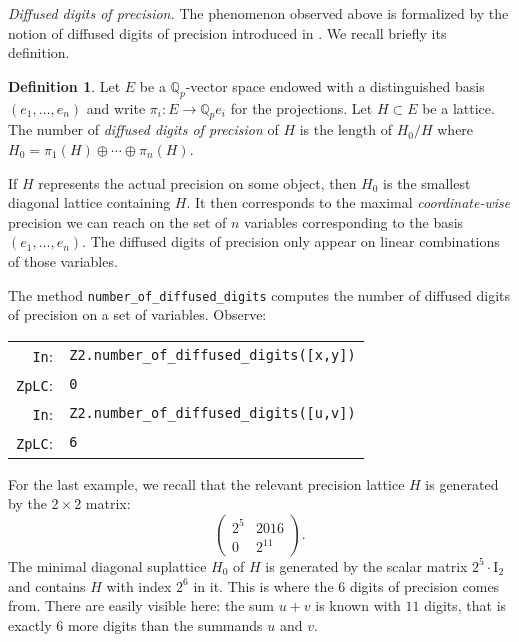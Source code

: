 \documentclass[sigconf]{acmart}
\newcommand{\Q}{\mathbb Q}
\newcommand{\Qp}{\Q_p}
\newcommand{\cIn}{{\color{input} \tt \phantom{Zp}In}:}
\newcommand{\cZpLC}{{\color{output} \tt ZpLC}:}
\theoremstyle{definition}
\newtheorem{deftn}[theo]{Definition}
\begin{document}
\medskip

\noindent \textit{Diffused digits of precision.}
%
The phenomenon observed above is formalized by the notion of
diffused digits of precision introduced in \cite{}. We recall
briefly its definition.

\begin{deftn}
\label{def:diffused}
Let $E$ be a $\Qp$-vector space endowed with a distinguished basis 
$(e_1, \ldots, e_n)$ and write $\pi_i : E \to \Qp e_i$ for the 
projections.
Let $H \subset E$ be a lattice. The number of \emph{diffused digits of 
precision} of $H$ is the length of $H_0/H$ where $H_0 = \pi_1(H) \oplus 
\cdots \oplus \pi_n(H)$.
\end{deftn}

If $H$ represents the actual precision on some object, then
$H_0$ is the smallest diagonal lattice containing $H$. It then
corresponds to the maximal \emph{coordinate-wise} precision we can 
reach on the set of $n$ variables corresponding to the basis $(e_1,
\ldots, e_n)$.
The diffused digits of precision only appear on linear combinations
of those variables.

The method {\color{method}\verb?number_of_diffused_digits?} computes the number of
diffused digits of precision on a set of variables. Observe:

\smallskip

{\noindent \small
\begin{tabular}{rl}
\cIn   & {\color{ring}\verb?Z2?}\verb?.?{\color{method}\verb?number_of_diffused_digits?}\verb?([x,y])? \\
\cZpLC & \verb?0? \\
\cIn   & {\color{ring}\verb?Z2?}\verb?.?{\color{method}\verb?number_of_diffused_digits?}\verb?([u,v])? \\
\cZpLC & \verb?6? \\
\end{tabular}}

\smallskip

\noindent
For the last example, we recall that the relevant precision lattice 
$H$ is generated by the $2 \times 2$ matrix:
$$\left(\begin{matrix} 2^5 & 2016 \\ 0 & 2^{11} \end{matrix}\right).$$
The minimal diagonal suplattice $H_0$ of $H$ is generated by the scalar matrix 
$2^5 \cdot \text{I}_2$ and contains $H$ with index $2^6$ in it. This is 
where the $6$ digits of precision comes from.
There are easily visible here: the sum $u+v$ is known with $11$ digits,
that is exactly $6$ more digits than the summands $u$ and $v$.
\end{document}
